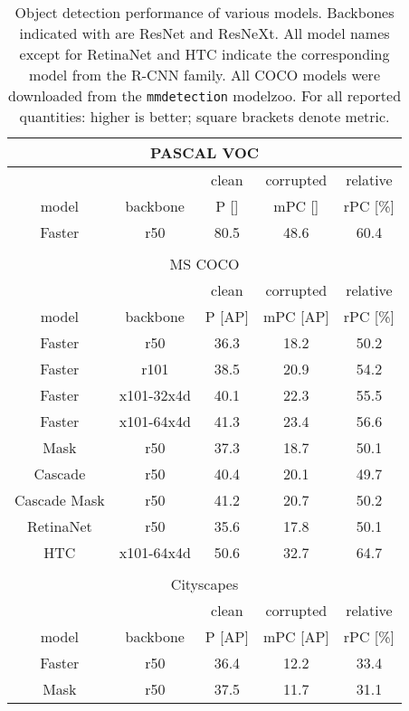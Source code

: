 \documentclass{article}
\begin{document}
\begin{table}[t!]\footnotesize
\begin{center}
\begin{tabular}{c|c|ccc}
\multicolumn{5}{c}{PASCAL VOC} \\
\toprule
\multicolumn{2}{c}{} & clean & corrupted & relative\\
model & backbone & P [] & mPC []& rPC \small{[\%]}\\
\hline
Faster & r50 & 80.5 & 48.6 & 60.4\\
\bottomrule

\multicolumn{5}{c}{} \\
\multicolumn{5}{c}{MS COCO} \\
\toprule
\multicolumn{2}{c}{} & clean & corrupted & relative\\
model & backbone & P \small{[AP]} & mPC \small{[AP]} & rPC \small{[\%]}\\
\hline
Faster & r50 & 36.3 & 18.2 & 50.2\\
Faster & r101 & 38.5 & 20.9 & 54.2\\
Faster & x101-32x4d & 40.1 & 22.3 & 55.5\\
Faster & x101-64x4d & 41.3 & 23.4 & 56.6\\
\hline
Mask & r50 & 37.3 & 18.7 & 50.1\\
Cascade & r50 & 40.4 & 20.1 & 49.7\\
Cascade Mask & r50 & 41.2 & 20.7 & 50.2\\
RetinaNet & r50 & 35.6 & 17.8 & 50.1\\
HTC & x101-64x4d & 50.6 & 32.7 & 64.7\\
\bottomrule

\multicolumn{5}{c}{} \\
\multicolumn{5}{c}{Cityscapes}\\
\toprule
\multicolumn{2}{c}{} & clean & corrupted & relative\\
model & backbone & P \small{[AP]} & mPC \small{[AP]} & rPC \small{[\%]}\\
\hline
Faster & r50 & 36.4 & 12.2 & 33.4\\
Mask & r50 & 37.5 & 11.7 & 31.1\\
\bottomrule
\end{tabular}
\caption{Object detection performance of various models. Backbones indicated with  are ResNet and  ResNeXt. All model names except for  RetinaNet and HTC indicate the corresponding model from the R-CNN family.  All COCO models were downloaded from the \texttt{mmdetection} modelzoo. For all reported quantities: higher is better; square brackets denote metric.}
\label{table:results_corruption_benchmark}
\vspace{-1.0cm}
\end{center}
\end{table}
\end{document}
